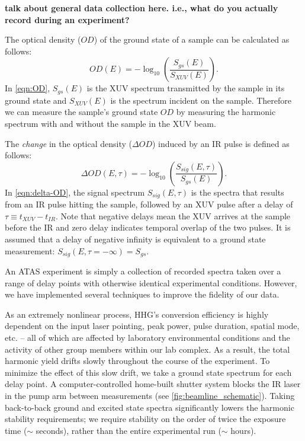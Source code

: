\textbf{talk about general data collection here. i.e., what do you actually record during an experiment?}

The optical density ($OD$) of the ground state of a sample can be calculated as follows:
\begin{equation}
OD(E) = -\log_{10} \left(\frac{S_{gs}(E)}{S_{XUV}(E)} \right).
\label{eqn:OD}
\end{equation}
In \cref{eqn:OD}, $S_{gs}(E)$ is the XUV spectrum transmitted by the sample in its ground state and $S_{XUV}(E)$ is the spectrum incident on the sample. Therefore we can measure the sample's ground state $OD$ by measuring the harmonic spectrum with and without the sample in the XUV beam.

The \textit{change} in the optical density ($\Delta OD$) induced by an IR pulse is defined as follows:
\begin{equation}
\Delta OD(E,\tau) = -\log_{10} \left(\frac{S_{sig}(E,\tau)}{S_{gs}(E)} \right).
\label{eqn:delta-OD}
\end{equation}
In \cref{eqn:delta-OD}, the signal spectrum $S_{sig}(E,\tau)$ is the spectra that results from an IR pulse hitting the sample, followed by an XUV pulse after a delay of $\tau \equiv t_{XUV} - t_{IR}$. Note that negative delays mean the XUV arrives at the sample before the IR and zero delay indicates temporal overlap of the two pulses. It is assumed that a delay of negative infinity is equivalent to a ground state measurement: $S_{sig}(E,\tau=-\infty) = S_{gs}$.

An ATAS experiment is simply a collection of recorded spectra taken over a range of delay points with otherwise identical experimental conditions. However, we have implemented several techniques to improve the fidelity of our data.

As an extremely nonlinear process, HHG's conversion efficiency is highly dependent on the input laser pointing, peak power, pulse duration, spatial mode, etc. -- all of which are affected by laboratory environmental conditions and the activity of other group members within our lab complex. As a result, the total harmonic yield drifts slowly throughout the course of the experiment. To minimize the effect of this slow drift, we take a ground state spectrum for each delay point. A computer-controlled home-built shutter system blocks the IR laser in the pump arm between measurements (see \cref{fig:beamline_schematic}). Taking back-to-back ground and excited state spectra significantly lowers the harmonic stability requirements; we require stability on the order of twice the exposure time ($\sim$ seconds), rather than the entire experimental run ($\sim$ hours).


